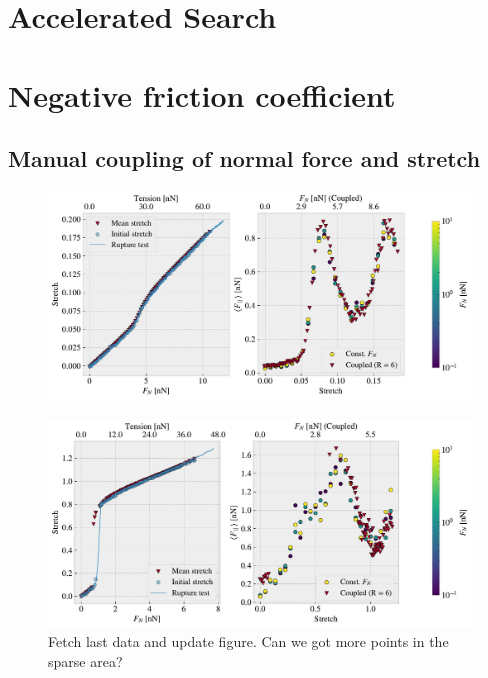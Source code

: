  
\chapter{Accelerated Search}

\chapter{Negative friction coefficient}
\section{Manual coupling of normal force and stretch}

\begin{figure}[H]
  \centering
  \includegraphics[width=0.9\linewidth]{figures/negative_coefficient/manual_coupling_free_pop1_7_5.pdf}
  \caption{}
  \label{fig:nanomachine}
\end{figure}

\begin{figure}[H]
  \centering
  \includegraphics[width=0.9\linewidth]{figures/negative_coefficient/manual_coupling_free_hon3215.pdf}
  \caption{Fetch last data and update figure. Can we got more points in the sparse area?}
  \label{fig:nanomachine}
\end{figure}





